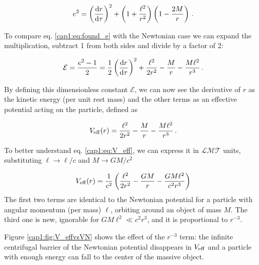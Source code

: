 \begin{equation}
    e^2 = \left(\dv{r}{\tau}\right)^2 + \left(1 + \frac{\ell^2}{r^2}\right)
    \left(1 - \frac{2M}{r} \right) \, .
   \label{cap1:eq:found_e}
\end{equation}

To compare eq. \ref{cap1:eq:found_e} with the Newtonian case we can expand
the multiplication, subtract 1 from both sides and divide by a factor of 2:

\begin{equation}
    \mathcal E = \frac{e^2 - 1}{2} = \frac{1}{2} \left(\dv{r}{\tau}\right)^2
    + \frac{\ell^2}{2 r^2} - \frac{M}{r} - \frac{M \ell^2}{r^3} \, .
    \label{cap1:eq:found_epsilon}
\end{equation}

By defining this dimensionless constant $\mathcal E$, we can now see the
derivative of $r$ as the kinetic energy (per unit rest mass) and the other
terms as an effective potential acting on the particle, defined as

\begin{equation}
    V_{\rm eff}(r)
    = \frac{\ell^2}{2 r^2} - \frac{M}{r} - \frac{M \ell^2}{r^3} \, .
    \label{cap1:eq:V_eff}
\end{equation}

To better understand eq. \ref{cap1:eq:V_eff}, we can express it in
$\mathcal{LMT}$ units, substituting $\ell \rightarrow \ell / c$ and 
$ M \rightarrow G M / c^2$

\begin{equation*}
    V_{\rm eff}(r)
    = \frac{1}{c^2} \left( \frac{\ell^2}{2 r^2} - \frac{G M}{r}
    - \frac{G M \ell^2}{c^2 r^3} \right)
\end{equation*}
The first two terms are identical to the Newtonian potential for a particle
with angular momentum (per mass) $\ell$, orbiting around an object of mass $M$.
The third one is new, ignorable for $GM\ell^2 \ll c^2 r^3$, and it is
proportional
to $r^{-3}$.

Figure \ref{cap1:fig:V_effvsVN} shows the effect of the $r^{-3}$ term: the
infinite centrifugal barrier of the Newtonian potential disappears in
$V_{\rm eff}$ and a particle with enough energy can fall to the center of the
massive object.

